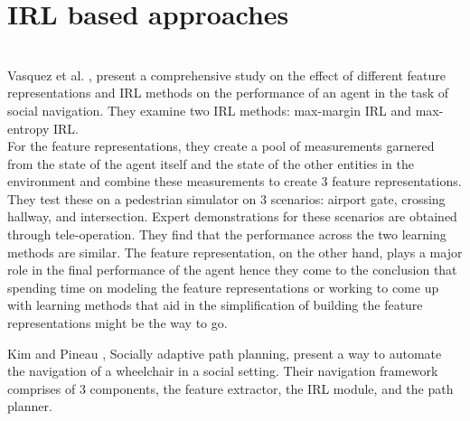 \section{IRL based approaches}
 \\
Vasquez et al. \cite{vasquez_inverse_2014}, present a comprehensive study on the effect of different feature representations and IRL methods on the performance of an agent in the task of social navigation. They examine two IRL methods: max-margin IRL and max-entropy IRL.  \\
For the feature representations, they create a pool of measurements garnered from the state of the agent itself and the state of the other entities in the environment and combine these measurements to create 3 feature representations. \\
They test these on a  pedestrian simulator on 3 scenarios: airport gate, crossing hallway, and intersection. Expert demonstrations for these scenarios are obtained through tele-operation. They find that the performance across the two learning methods are similar. The feature representation, on the other hand, plays a major role in the final performance of the agent hence they come to the conclusion that spending time on modeling the feature representations or working to come up with learning methods that aid in the simplification of building the feature representations might be the way to go.
\\
\par
Kim and Pineau \cite{kim_socially_2016}, Socially adaptive path planning, present a way to automate the navigation of a wheelchair in a social setting. Their navigation framework comprises of 3 components, the feature extractor, the IRL module, and the path planner.\\
